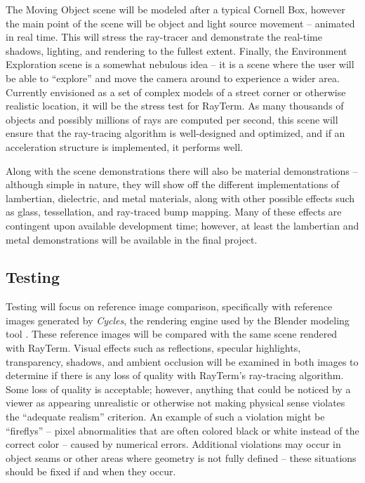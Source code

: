 \documentclass[11pt]{article}
\newcommand{\name}{{\sc RayTerm}}
\begin{document}
The Moving Object scene will be modeled after a typical Cornell Box, however the main point of the scene will be object and light source movement -- animated in real time.
This will stress the ray-tracer and demonstrate the real-time shadows, lighting, and rendering to the fullest extent.
Finally, the Environment Exploration scene is a somewhat nebulous idea -- it is a scene where the user will be able to ``explore'' and move the camera around to experience a wider area.
Currently envisioned as a set of complex models of a street corner or otherwise realistic location, it will be the stress test for \name.
As many thousands of objects and possibly millions of rays are computed per second, this scene will ensure that the ray-tracing algorithm is well-designed and optimized, and if an acceleration structure is implemented, it performs well.

Along with the scene demonstrations there will also be material demonstrations -- although simple in nature, they will show off the different implementations of lambertian, dielectric, and metal materials, along with other possible effects such as glass, tessellation, and ray-traced bump mapping.
Many of these effects are contingent upon available development time; however, at least the lambertian and metal demonstrations will be available in the final project.


\subsection{Testing}
\label{sec:evaluate:testing}

Testing will focus on reference image comparison, specifically with reference images generated by {\it Cycles}, the rendering engine used by the Blender modeling tool \cite{blender}.
These reference images will be compared with the same scene rendered with \name.
Visual effects such as reflections, specular highlights, transparency, shadows, and ambient occlusion will be examined in both images to determine if there is any loss of quality with \name's ray-tracing algorithm.
Some loss of quality is acceptable; however, anything that could be noticed by a viewer as appearing unrealistic or otherwise not making physical sense violates the ``adequate realism'' criterion.
An example of such a violation might be ``fireflys'' -- pixel abnormalities that are often colored black or white instead of the correct color -- caused by numerical errors.
Additional violations may occur in object seams or other areas where geometry is not fully defined -- these situations should be fixed if and when they occur.
\end{document}
